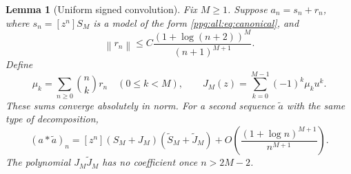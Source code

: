 \documentclass[11pt,letterpaper]{article}
\newtheorem{lemma}[theorem]{Lemma}
\theoremstyle{remark}\newtheorem{remark}[theorem]{Remark}
\numberwithin{equation}{section}
\newcommand{\norm}[1]{\left\|#1\right\|}
\begin{document}
\begin{lemma}[Uniform signed convolution]\label{ppg:all:lem:conv}
Fix $M\ge1$. Suppose $a_n=s_n+r_n$, where $s_n=[z^n]S_M$ is a model of the form \eqref{ppg:all:eq:canonical}, and
\begin{equation}\label{ppg:all:eq:residue}
 \norm{r_n}\le C\frac{(1+\log(n+2))^M}{(n+1)^{M+1}}.
\end{equation}
Define
\begin{equation}\label{ppg:all:eq:moments}
 \mu_k=\sum_{n\ge0}\binom nk r_n\quad(0\le k<M),
 \qquad J_M(z)=\sum_{k=0}^{M-1}(-1)^k\mu_ku^k.
\end{equation}
These sums converge absolutely in norm. For a second sequence $\widetilde a$ with the same type of decomposition,
\begin{equation}\label{ppg:all:eq:conv}
 (a*\widetilde a)_n=[z^n](S_M+J_M)(\widetilde S_M+\widetilde J_M)
      +O\!\left(\frac{(1+\log n)^{M+1}}{n^{M+1}}\right).
\end{equation}
The polynomial $J_M\widetilde J_M$ has no coefficient once $n>2M-2$.
\end{lemma}
\end{document}
